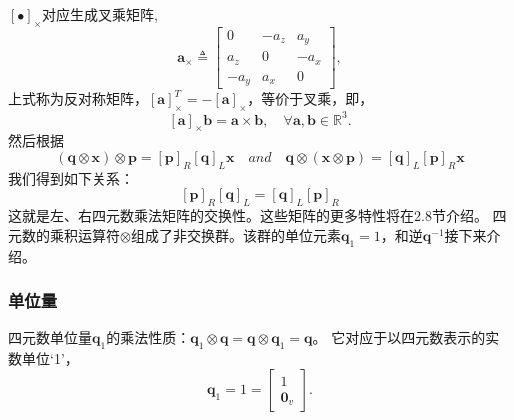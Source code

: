 \documentclass[10pt, a4paper]{article}
\begin{document}
  $[\bullet]_\times$对应生成叉乘矩阵,
  \begin{equation} \label{eq-20}
    \mathbf{a}_\times \triangleq
    \begin{bmatrix}
      0 & -a_z & a_y \\
      a_z & 0 & -a_x \\
      -a_y & a_x & 0
    \end{bmatrix} ,
  \end{equation}
  上式称为反对称矩阵，$[\mathbf{a}]_\times^T = -[\mathbf{a}]_\times$，等价于叉乘，即，
  \begin{equation} \label{eq-21}
    [\mathbf{a}]_\times\mathbf{b} = \mathbf{a} \times \mathbf{b}, \quad \forall \mathbf{a}, \mathbf{b} \in \mathbb{R}^3.
  \end{equation}
  然后根据
  \begin{equation} \label{eq-22}
    (\mathbf{q} \otimes \mathbf{x}) \otimes \mathbf{p} = [\mathbf{p}]_R [\mathbf{q}]_L \mathbf{x} \quad and \quad
    \mathbf{q} \otimes (\mathbf{x} \otimes \mathbf{p}) = [\mathbf{q}]_L [\mathbf{p}]_R \mathbf{x}
  \end{equation}
  我们得到如下关系：
  \begin{equation} \label{eq-23}
    [\mathbf{p}]_R [\mathbf{q}]_L = [\mathbf{q}]_L [\mathbf{p}]_R
  \end{equation}
  这就是左、右四元数乘法矩阵的交换性。这些矩阵的更多特性将在$2.8$节介绍。
  四元数的乘积运算符$\otimes$组成了非交换群。该群的单位元素$\mathbf{q}_1 = 1$，和逆$\mathbf{q}^{-1}$接下来介绍。

  \subsubsection{单位量}
  四元数单位量$\mathbf{q}_1$的乘法性质：$\mathbf{q}_1 \otimes \mathbf{q} = \mathbf{q} \otimes \mathbf{q}_1 = \mathbf{q}$。
  它对应于以四元数表示的实数单位‘1’，
  \begin{equation*}
    \mathbf{q}_1 = 1 =
    \begin{bmatrix}
      1 \\
      \mathbf{0}_v
    \end{bmatrix} .
  \end{equation*}
\end{document}
